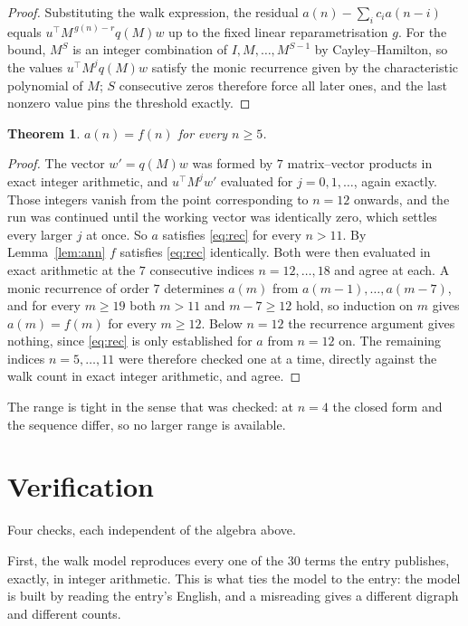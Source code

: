 \documentclass[11pt,a4paper]{article}
\theoremstyle{plain}
\newtheorem{theorem}{Theorem}
\theoremstyle{definition}
\begin{document}
\begin{proof}
Substituting the walk expression, the residual $a(n)-\sum_ic_ia(n-i)$ equals
$u^{\!\top}M^{\,g(n)-r}q(M)w$ up to the fixed linear reparametrisation $g$. For the bound,
$M^{S}$ is an integer combination of $I,M,\dots,M^{S-1}$ by Cayley--Hamilton, so the values
$u^{\!\top}M^{j}q(M)w$ satisfy the monic recurrence given by the characteristic polynomial of
$M$; $S$ consecutive zeros therefore force all later ones, and the last nonzero value pins the
threshold exactly.
\end{proof}

\begin{theorem}
$a(n)=f(n)$ for every $n\ge5$.
\end{theorem}

\begin{proof}
The vector $w'=q(M)w$ was formed by $7$ matrix--vector products in exact integer
arithmetic, and $u^{\!\top}M^{j}w'$ evaluated for $j=0,1,\dots$, again exactly. Those integers
vanish from the point corresponding to $n=12$ onwards, and the run was continued until the
working vector was identically zero, which settles every larger $j$ at once. So $a$ satisfies
\eqref{eq:rec} for every $n>11$. By Lemma~\ref{lem:ann} $f$ satisfies \eqref{eq:rec}
identically. Both were then evaluated in exact arithmetic at the $7$ consecutive indices
$n=12,\dots,18$ and agree at each. A monic recurrence of order $7$
determines $a(m)$ from $a(m-1),\dots,a(m-7)$, and for every $m\ge19$ both
$m>11$ and $m-7\ge12$ hold, so induction on $m$ gives $a(m)=f(m)$ for every
$m\ge12$.
Below $n=12$ the recurrence argument gives nothing, since \eqref{eq:rec} is only
established for $a$ from $n=12$ on. The remaining indices $n=5,\dots,11$ were
therefore checked one at a time, directly against the walk count in exact integer arithmetic,
and agree.
\end{proof}

The range is tight in the sense that was checked: at $n=4$ the closed form and the sequence differ, so no larger range is available.

\section{Verification}

Four checks, each independent of the algebra above.

First, the walk model reproduces every one of the $30$ terms the entry publishes,
exactly, in integer arithmetic. This is what ties the model to the entry: the model is built
by reading the entry's English, and a misreading gives a different digraph and different
counts.
\end{document}
